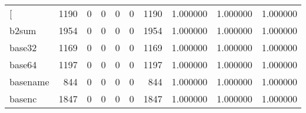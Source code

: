 \begin{longtable}{lrrrrrrrrr}
\bottomrule
\endlastfoot
{[}         &                                1190 &                                               0 &                                              0 &                                             0 &                                              0 &                                         1190 &                                           1.000000 &                               1.000000 &                             1.000000 \\
b2sum     &                                1954 &                                               0 &                                              0 &                                             0 &                                              0 &                                         1954 &                                           1.000000 &                               1.000000 &                             1.000000 \\
base32    &                                1169 &                                               0 &                                              0 &                                             0 &                                              0 &                                         1169 &                                           1.000000 &                               1.000000 &                             1.000000 \\
base64    &                                1197 &                                               0 &                                              0 &                                             0 &                                              0 &                                         1197 &                                           1.000000 &                               1.000000 &                             1.000000 \\
basename  &                                 844 &                                               0 &                                              0 &                                             0 &                                              0 &                                          844 &                                           1.000000 &                               1.000000 &                             1.000000 \\
basenc    &                                1847 &                                               0 &                                              0 &                                             0 &                                              0 &                                         1847 &                                           1.000000 &                               1.000000 &                             1.000000 \\

\end{longtable}
